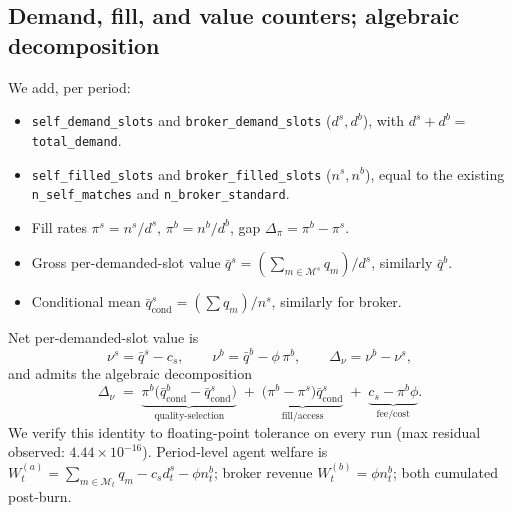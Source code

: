\documentclass[11pt,a4paper]{article}
\begin{document}
\subsection{Demand, fill, and value counters; algebraic decomposition}
We add, per period:
\begin{itemize}[leftmargin=1.5em]
\item \texttt{self\_demand\_slots} and \texttt{broker\_demand\_slots} ($d^s, d^b$), with $d^s + d^b = $ \texttt{total\_demand}.
\item \texttt{self\_filled\_slots} and \texttt{broker\_filled\_slots} ($n^s, n^b$), equal to the existing \texttt{n\_self\_matches} and \texttt{n\_broker\_standard}.
\item Fill rates $\pi^s = n^s/d^s$, $\pi^b = n^b/d^b$, gap $\Delta_\pi = \pi^b - \pi^s$.
\item Gross per-demanded-slot value $\bar q^s = (\sum_{m \in \mathcal{M}^s} q_m)/d^s$, similarly $\bar q^b$.
\item Conditional mean $\bar q^s_\text{cond} = (\sum q_m)/n^s$, similarly for broker.
\end{itemize}
Net per-demanded-slot value is
\begin{equation}
\label{eq:net}
\nu^s = \bar q^s - c_s, \qquad \nu^b = \bar q^b - \phi\,\pi^b, \qquad \Delta_\nu = \nu^b - \nu^s,
\end{equation}
and admits the algebraic decomposition
\begin{equation}
\label{eq:decomp}
\Delta_\nu \;=\; \underbrace{\pi^b\bigl(\bar q^b_\text{cond} - \bar q^s_\text{cond}\bigr)}_{\text{quality-selection}}
\;+\; \underbrace{\bigl(\pi^b - \pi^s\bigr)\bar q^s_\text{cond}}_{\text{fill/access}}
\;+\; \underbrace{c_s - \pi^b\phi}_{\text{fee/cost}}.
\end{equation}
We verify this identity to floating-point tolerance on every run (max residual observed: $4.44{\times}10^{-16}$). Period-level agent welfare is $W^{(a)}_t = \sum_{m \in \mathcal{M}_t} q_m - c_s d^s_t - \phi n^b_t$; broker revenue $W^{(b)}_t = \phi n^b_t$; both cumulated post-burn.
\end{document}
